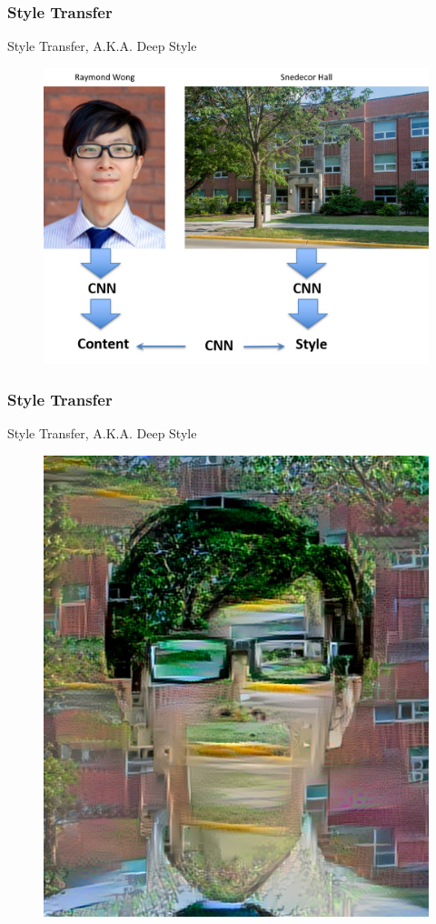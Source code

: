 \documentclass{beamer}
\begin{document}
\begin{frame}
	\frametitle{Style Transfer}
\begin{center}
Style Transfer, A.K.A. Deep Style
\end{center}
	\begin{figure}
		\includegraphics[width=0.8\linewidth]{Picture17}
	\end{figure}
\end{frame}
\begin{frame}
	\frametitle{Style Transfer}
\begin{center}
	Style Transfer, A.K.A. Deep Style
\end{center}
	\begin{figure}
		\includegraphics[width=0.5\linewidth]{style_transfer}
	\end{figure}
\end{frame}
%
\end{document}
